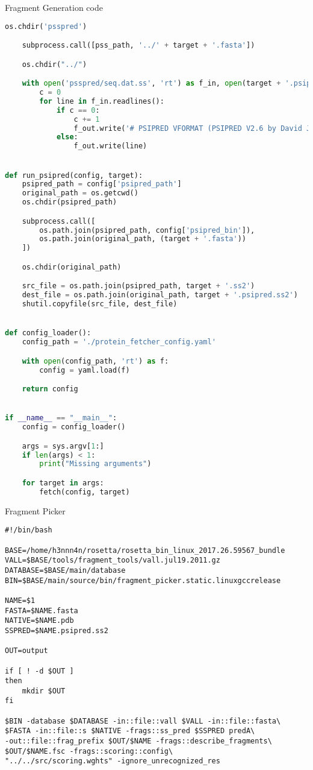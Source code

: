\begin{section}{Fragment Generation code}
\begin{lstlisting}[language=Python]
    os.chdir('psspred')

    subprocess.call([pss_path, '../' + target + '.fasta'])

    os.chdir("../")

    with open('psspred/seq.dat.ss', 'rt') as f_in, open(target + '.psipred.ss2', 'wt') as f_out:
        c = 0
        for line in f_in.readlines():
            if c == 0:
                c += 1
                f_out.write('# PSIPRED VFORMAT (PSIPRED V2.6 by David Jones)\n')
            else:
                f_out.write(line)


def run_psipred(config, target):
    psipred_path = config['psipred_path']
    original_path = os.getcwd()
    os.chdir(psipred_path)

    subprocess.call([
        os.path.join(psipred_path, config['psipred_bin']),
        os.path.join(original_path, (target + '.fasta'))
    ])

    os.chdir(original_path)

    src_file = os.path.join(psipred_path, target + '.ss2')
    dest_file = os.path.join(original_path, target + '.psipred.ss2')
    shutil.copyfile(src_file, dest_file)


def config_loader():
    config_path = './protein_fetcher_config.yaml'

    with open(config_path, 'rt') as f:
        config = yaml.load(f)

    return config


if __name__ == "__main__":
    config = config_loader()

    args = sys.argv[1:]
    if len(args) < 1:
        print("Missing arguments")

    for target in args:
        fetch(config, target)
\end{lstlisting}
\end{section}

\begin{section}{Fragment Picker}\label{sec:frag-picker}
\begin{lstlisting}
#!/bin/bash

BASE=/home/h3nnn4n/rosetta/rosetta_bin_linux_2017.26.59567_bundle
VALL=$BASE/tools/fragment_tools/vall.jul19.2011.gz
DATABASE=$BASE/main/database
BIN=$BASE/main/source/bin/fragment_picker.static.linuxgccrelease

NAME=$1
FASTA=$NAME.fasta
NATIVE=$NAME.pdb
SSPRED=$NAME.psipred.ss2

OUT=output

if [ ! -d $OUT ]
then
    mkdir $OUT
fi

$BIN -database $DATABASE -in::file::vall $VALL -in::file::fasta\
$FASTA -in::file::s $NATIVE -frags::ss_pred $SSPRED predA\
-out::file::frag_prefix $OUT/$NAME -frags::describe_fragments\
$OUT/$NAME.fsc -frags::scoring::config\
"../../src/scoring.wghts" -ignore_unrecognized_res
\end{lstlisting}
\end{section}

